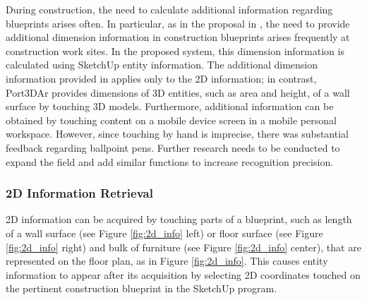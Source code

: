During construction, the need to calculate additional information regarding blueprints arises often. In particular, as in the proposal in \cite{song_penlight:_2009}, the need to provide additional dimension information in construction blueprints arises frequently at construction work sites. In the proposed system, this dimension information is calculated using SketchUp entity information. The additional dimension information provided in \cite{song_penlight:_2009} applies only to the 2D information; in contrast, Port3DAr provides dimensions of 3D entities, such as area and height, of a wall surface by touching 3D models. Furthermore, additional information can be obtained by touching content on a mobile device screen in a mobile personal workspace. However, since touching by hand is imprecise, there was substantial feedback regarding ballpoint pens. Further research needs to be conducted to expand the field and add similar functions to increase recognition precision.


\subsubsection{2D Information Retrieval}

2D information can be acquired by touching parts of a blueprint, such as length of a wall surface (see Figure \ref{fig:2d_info} left) or floor surface (see Figure \ref{fig:2d_info} right) and bulk of furniture (see Figure \ref{fig:2d_info} center), that are represented on the floor plan, as in Figure \ref{fig:2d_info}. This causes entity information to appear after its acquisition by selecting 2D coordinates touched on the pertinent construction blueprint in the SketchUp program.

